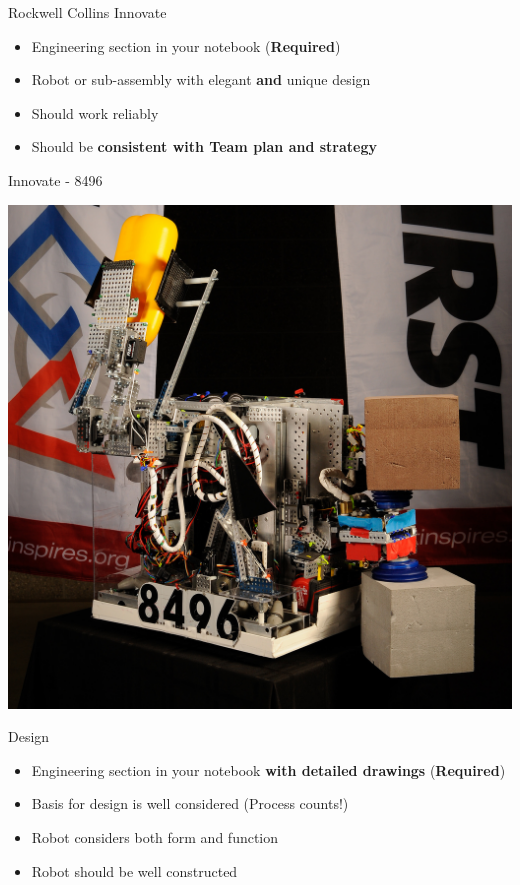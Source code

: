 \documentclass{beamer}
\begin{document}
  \begin{frame}{Rockwell Collins Innovate}
    \begin{itemize}
    \item Engineering section in your notebook (\textbf{Required})\pause
    \item Robot or sub-assembly with elegant \textbf{and} unique design \pause
    \item Should work reliably \pause
    \item Should be \textbf{consistent with Team plan and strategy} \pause
    \end{itemize}
  \end{frame}

  \begin{frame}{Innovate - 8496}
    \begin{center}
      \includegraphics[width=.7\textwidth]{8496_innovate}
    \end{center}
  \end{frame}

  \begin{frame}{Design}
    \begin{itemize}
    \item Engineering section in your notebook \textbf{with detailed drawings}  (\textbf{Required})\pause
    \item Basis for design is well considered (Process counts!) \pause
    \item Robot considers both form and function \pause
    \item Robot should be well constructed
    \end{itemize}
  \end{frame}
\end{document}
